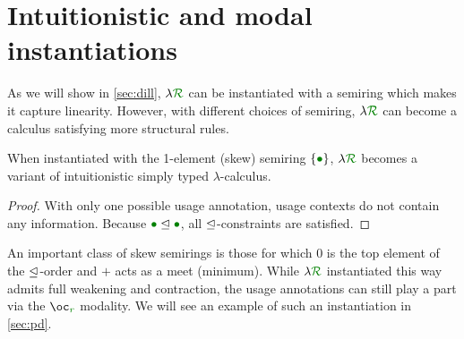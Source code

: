 \documentclass[submission,copyright,creativecommons]{eptcs}
\begin{document}
\section{Intuitionistic and modal instantiations}\label{sec:general}

As we will show in \autoref{sec:dill}, $\name$ can be instantiated with
a semiring which makes it capture linearity.
However, with different choices of semiring, $\name$ can become a calculus
satisfying more structural rules.

\begin{lemma}
  When instantiated with the 1-element (skew) semiring
  $\{\rescomment{\bullet}\}$, $\name$ becomes a variant of intuitionistic
  simply typed $\lambda$-calculus.
\end{lemma}
\begin{proof}
  With only one possible usage annotation, usage contexts do not contain any
  information.
  Because $\rescomment{\bullet} \subres \rescomment{\bullet}$, all
  $\trianglelefteq$-constraints are satisfied.
\end{proof}

An important class of skew semirings is those for which $0$ is the top element
of the $\trianglelefteq$-order and $+$ acts as a meet (minimum).
While $\name$ instantiated this way admits full weakening and contraction, the
usage annotations can still play a part via the $\excl{r}{}$ modality.
We will see an example of such an instantiation in \autoref{sec:pd}.
\end{document}
